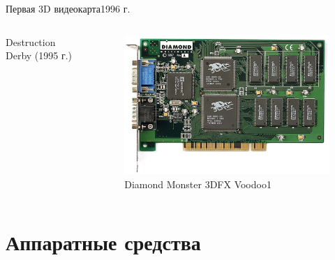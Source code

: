 \documentclass{beamer}
\begin{document}
\begin{frame}{Первая 3D видеокарта}{1996 г.}
	\begin{columns}
		\begin{column}{0.5\textwidth}
			Destruction Derby (1995 г.)
		\end{column}
		\begin{column}{0.5\textwidth}
			\begin{figure} 
				\includegraphics[width=\textwidth]{images/Diamond_Monster_3D_3DFX_Voodoo1.png}
				\caption {Diamond Monster 3DFX Voodoo1}
			\end{figure}
		\end{column}
	\end{columns}
\end{frame}

\section{Аппаратные средства}
\end{document}
